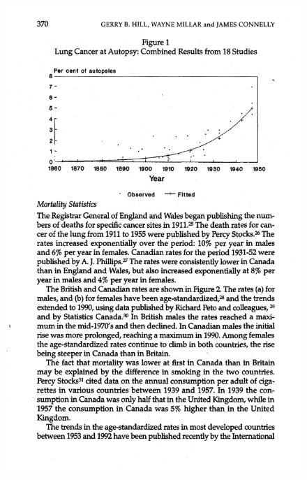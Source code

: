 \documentclass[notes=show]{beamer}
\begin{document}
\begin{frame}[plain, shrink=20]
	\begin{figure}
	\includegraphics[scale=0.75]{./lecture_includes/cancer_fig1.pdf}
	\end{figure}


\end{frame}
\end{document}
